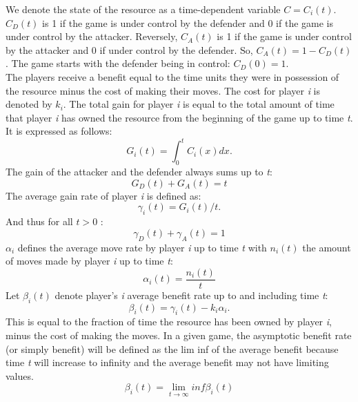 We denote the state of the resource as a time-dependent variable $C=C_{i}(t)$. 
$C_{D}(t)$ is 1 if the game is under control by the defender and 0 if the game is under control by the attacker. Reversely, $C_{A}(t)$ is 1 if the game is under control by the attacker and 0 if under control by the defender. So, $C_{A}(t)= 1 - C_{D}(t)$.
The game starts with the defender being in control: $C_{D}(0)= 1$. \\


The players receive a benefit equal to the time units they were in possession of the resource minus the cost of making their moves. The cost for player \textit{i} is denoted by $k_{i}$. 
The total gain for player \textit{i} is equal to the total amount of time that player \textit{i} has owned the resource from the beginning of the game up to time \textit{t}. It is expressed as follows:
\begin{equation}\label{first}
G_{i}(t) = \int_0^t \! C_{i}(x) dx.
\end{equation}
The gain of the attacker and the defender always sums up to \textit{t}:
\begin{equation}\label{first}
G_{D}(t) + G_{A}(t) = t
\end{equation}
The average gain rate of player \textit{i} is defined as:
\begin{equation}\label{first}
\gamma_{i}(t) = G_{i}(t)/t.
\end{equation}
And thus for all $t > 0$ :
\begin{equation}\label{first}
\gamma_{D}(t) + \gamma_{A}(t) = 1
\end{equation}
$\alpha_{i}$ defines the average move rate by player \textit{i} up to time \textit{t} with $n_{i}(t)$ the amount of moves made by player \textit{i} up to time \textit{t}:
\begin{equation}
\alpha_{i}(t) = \dfrac{n_{i}(t)}{t}
\end{equation}
Let $\beta_{i}(t)$ denote player's \textit{i} average benefit rate up to and including time \textit{t}:
\begin{equation}\label{first}
\beta_{i}(t) = \gamma_{i}(t) - k_{i}\alpha_{i}.
\end{equation}
This is equal to the fraction of time the resource has been owned by player \textit{i}, minus the cost of making the moves.
In a given game, the asymptotic benefit rate (or simply benefit) will be defined as the lim inf of the average benefit because time\textit{ t} will increase to infinity and the average benefit may not have limiting values.
\begin{equation}
\beta_{i}(t)  = \lim_{t \to \infty} inf \beta_{i}(t) 
\end{equation}
\\


